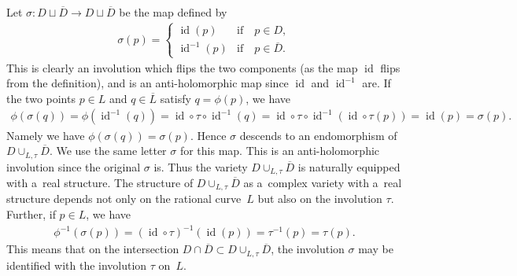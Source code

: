\documentclass[11pt]{article}
\numberwithin{equation}{section}
\DeclareMathOperator{\id}{id}
\begin{document}
Let $\sigma:D\sqcup \overline D\to D\sqcup \overline D$ be the map def\/ined by
\begin{gather*}
\sigma (p) =
\begin{cases}
\id (p) &\text{if}\quad p\in D,
\\
\id^{-1}(p) &\text{if}\quad p\in \overline D.
\end{cases}
\end{gather*}
This is clearly an involution which f\/lips the two components (as the map $\id$ f\/lips from the def\/inition),
and is an anti-holomorphic map since $\id$ and $\id^{-1}$ are.
If the two points $p\in L$ and $q\in \overline L$ satisfy $q = \phi(p)$, we have
\begin{gather*}
\phi(\sigma(q)) = \phi(\id^{-1}(q))=\id\circ\tau\circ\id^{-1}(q)=\id\circ\tau\circ\id^{-1} (\id\circ\tau(p)) = \id(p)=\sigma(p).
\end{gather*}
Namely we have $\phi(\sigma(q)) = \sigma(p)$.
Hence $\sigma$ descends to an endomorphism of $D\cup_{L,\tau}\overline D$.
We use the same letter $\sigma$ for this map.
This is an anti-holomorphic involution since the original $\sigma$ is.
Thus the variety $D\cup_{L,\tau}\overline D$ is naturally equipped with a~real structure.
The structure of $D\cup_{L,\tau}\overline D$ as a~complex variety with a~real structure depends not only on the
rational curve~$L$ but also on the involution $\tau$.
Further, if $p\in L$, we have
\begin{gather*}
\phi^{-1}(\sigma(p)) = (\id\circ\tau)^{-1}(\id (p)) = \tau^{-1}(p) = \tau (p).
\end{gather*}
This means that on the intersection $D\cap \overline D\subset D\cup_{L,\tau}\overline D$, the involution $\sigma$ may be
identif\/ied with the involution $\tau$ on~$L$.
\end{document}
